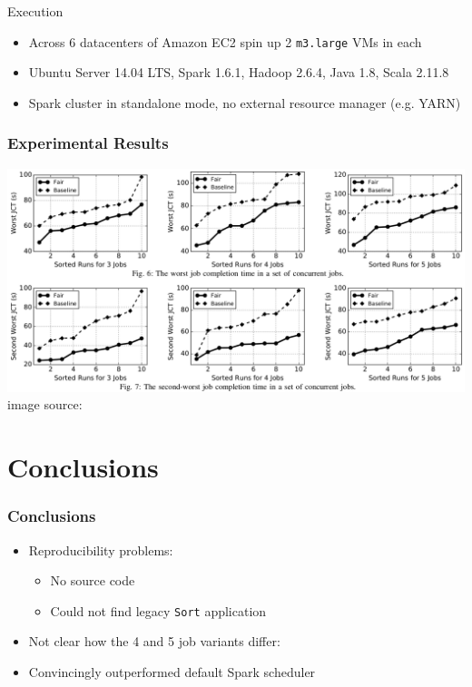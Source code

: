 \documentclass[presentation,professionalfonts]{beamer}
\begin{document}
\begin{frame}{Execution}
  \begin{itemize}
  \item Across 6 datacenters of Amazon EC2 spin up 2 \texttt{m3.large} VMs in each
  \item Ubuntu Server 14.04 LTS, Spark 1.6.1, Hadoop 2.6.4, Java 1.8, Scala 2.11.8
  \item Spark cluster in standalone mode, no external resource manager (e.g. YARN)
  \end{itemize}
\end{frame}

\begin{frame}
  \frametitle{Experimental Results}
  \begin{center}
  \includegraphics[width=\textwidth]{main_result}\\
  image source: \textcite{Chen2017}
  \end{center}
\end{frame}

\section{Conclusions}

\begin{frame}
  \frametitle{Conclusions}
  \begin{itemize}
  \item Reproducibility problems:
    \begin{itemize}
    \item No source code
    \item Could not find legacy \texttt{Sort} application
    \end{itemize}
  \item Not clear how the 4 and 5 job variants differ:
  \item Convincingly outperformed default Spark scheduler
  \end{itemize}
\end{frame}
\end{document}
